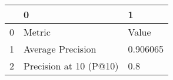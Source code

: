 \begin{tabular}{lll}
\toprule
{} &                       0 &         1 \\
\midrule
0 &                  Metric &     Value \\
1 &       Average Precision &  0.906065 \\
2 &  Precision at 10 (P@10) &       0.8 \\
\bottomrule
\end{tabular}
